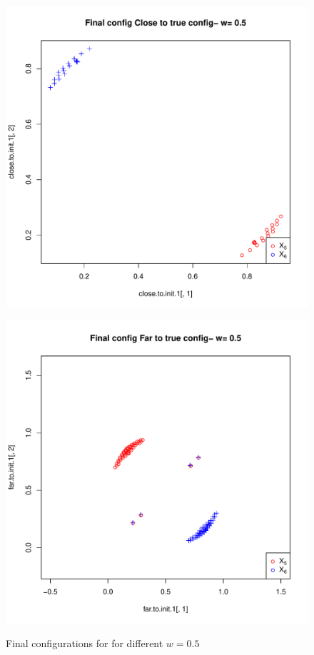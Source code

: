 \documentclass[11pt]{article} %
\begin{document}
\begin{figure}
\begin{minipage}[b]{0.5\linewidth}
\centering
\includegraphics[scale=0.35]{true-min-w-0_5.pdf}

\label{fig:figure2-1}
\end{minipage}
\hspace{0.5cm}
\begin{minipage}[b]{0.5\linewidth}
\centering
\includegraphics[scale=0.35]{other-min-w-0_5.pdf}

\label{fig:figure2-2}
\end{minipage}

\caption{Final configurations for for different $w=0.5$ }
\label{fig:Finalconfig-MultMin-w-0_5}

\end{figure}
\end{document}
